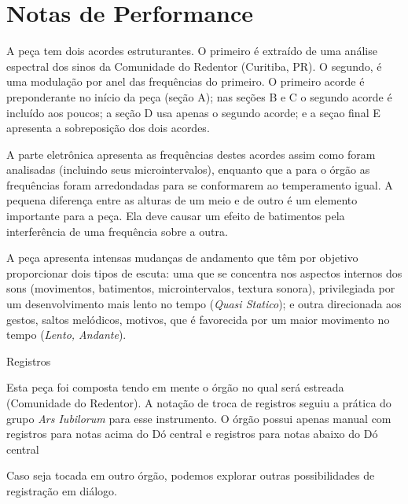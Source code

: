 
\section{Notas de Performance}

A peça tem dois acordes estruturantes. O primeiro é extraído de uma análise espectral dos sinos da Comunidade do Redentor (Curitiba, PR). O segundo, é uma modulação por anel das frequências do primeiro. O primeiro acorde é preponderante no início da peça (seção A); nas seções B e C o segundo acorde é incluído aos poucos; a seção D usa apenas o segundo acorde; e a seçao final E apresenta a sobreposição dos dois acordes.

A parte eletrônica apresenta as frequências destes acordes assim como foram analisadas (incluindo seus microintervalos), enquanto que a para o órgão as frequências foram arredondadas para se conformarem ao temperamento igual. A  pequena diferença entre as alturas de um meio e de outro é  um elemento importante para a peça. Ela deve causar um efeito de batimentos pela interferência de uma frequência sobre a outra. 

A peça apresenta intensas mudanças de andamento que têm por objetivo proporcionar dois tipos de escuta: uma que se concentra nos aspectos internos dos sons (movimentos, batimentos, microintervalos, textura sonora), privilegiada por um desenvolvimento mais lento no tempo (\textit{Quasi Statico}); e outra direcionada aos gestos, saltos melódicos, motivos, que é favorecida por um maior movimento no tempo (\textit{Lento, Andante}).


Registros

Esta peça foi composta tendo em mente o órgão no qual será estreada (Comunidade do Redentor). A notação de troca de registros seguiu a prática do grupo \textit{Ars Iubilorum} para esse instrumento. O órgão possui apenas manual com registros para notas acima do Dó central e registros para notas abaixo do Dó central

\vspace{10mm}

Caso seja tocada em outro órgão, podemos explorar outras possibilidades de registração em diálogo.



